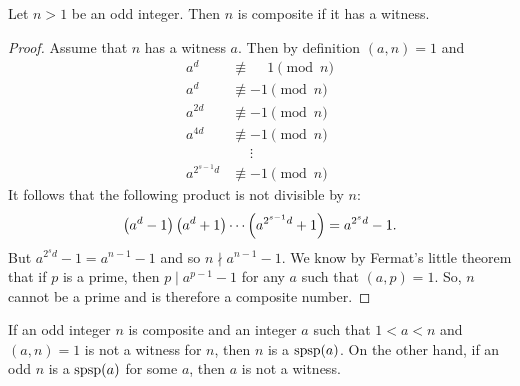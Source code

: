 	\begin{theorem}
		Let $n>1$ be an odd integer. Then $n$ is composite if it has a witness.
	\end{theorem}

	\begin{proof}
		Assume that $n$ has a witness $a$. Then by definition $(a,n)=1$ and
			\begin{align*}
				a^d &\not \equiv \phantom{-}1 \pmod n\\
				a^d &\not \equiv -1 \pmod n\\
				a^{2d} &\not \equiv -1 \pmod n\\
				a^{4d} &\not \equiv -1 \pmod n\\
				&\phantom{\equiv}\vdots\\
				a^{2^{s-1}d} &\not \equiv -1 \pmod n
			\end{align*}
		It follows that the following product is not divisible by $n$:
			\begin{align*}
				\left(a^d-1\right)\left(a^d+1\right)\cdots \left(a^{2^{s-1}d}+1\right) = a^{2^sd}-1.
			\end{align*}
		But $a^{2^sd}-1=a^{n-1}-1$ and so $n\nmid a^{n-1}-1$. We know by Fermat's little theorem that if $p$ is a prime, then $p\mid a^{p-1}-1$ for any $a$ such that $(a,p)=1$. So, $n$ cannot be a prime and is therefore a composite number.
	\end{proof}

	\begin{note}
		If an odd integer $n$ is composite and an integer $a$ such that $1<a<n$ and $(a,n)=1$ is not a witness for $n$, then $n$ is a $\operatorname{spsp}(a)$. On the other hand, if an odd $n$ is a $\operatorname{spsp}(a)$ for some $a$, then $a$ is not a witness.
	\end{note}

